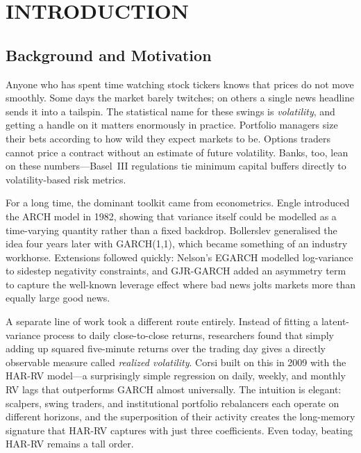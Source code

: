 \chapter{INTRODUCTION}
\label{ChapterIntroduction}

\section{Background and Motivation}

Anyone who has spent time watching stock tickers knows that prices do not move smoothly. Some days the market barely twitches; on others a single news headline sends it into a tailspin. The statistical name for these swings is \emph{volatility}, and getting a handle on it matters enormously in practice. Portfolio managers size their bets according to how wild they expect markets to be. Options traders cannot price a contract without an estimate of future volatility. Banks, too, lean on these numbers---Basel~III regulations tie minimum capital buffers directly to volatility-based risk metrics.

For a long time, the dominant toolkit came from econometrics. Engle introduced the ARCH model in 1982, showing that variance itself could be modelled as a time-varying quantity rather than a fixed backdrop. Bollerslev generalised the idea four years later with GARCH(1,1), which became something of an industry workhorse. Extensions followed quickly: Nelson's EGARCH modelled log-variance to sidestep negativity constraints, and GJR-GARCH added an asymmetry term to capture the well-known leverage effect where bad news jolts markets more than equally large good news.

A separate line of work took a different route entirely. Instead of fitting a latent-variance process to daily close-to-close returns, researchers found that simply adding up squared five-minute returns over the trading day gives a directly observable measure called \emph{realized volatility}. Corsi built on this in 2009 with the HAR-RV model---a surprisingly simple regression on daily, weekly, and monthly RV lags that outperforms GARCH almost universally. The intuition is elegant: scalpers, swing traders, and institutional portfolio rebalancers each operate on different horizons, and the superposition of their activity creates the long-memory signature that HAR-RV captures with just three coefficients. Even today, beating HAR-RV remains a tall order.

